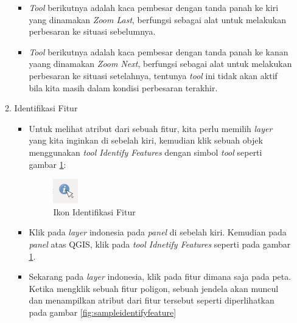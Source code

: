 \begin{enumerate}[A.]
\begin{enumerate}[1.]
\begin{itemize}
    \item \textit{Tool} berikutnya adalah kaca pembesar dengan tanda panah ke kiri yang dinamakan \textit{Zoom Last}, berfungsi sebagai alat untuk melakukan perbesaran ke situasi sebelumnya. 
    
    \item \textit{Tool} berikutnya adalah kaca pembesar dengan tanda panah ke kanan yaang dinamakan \textit{Zoom Next}, berfungsi sebagai alat untuk melakukan perbesaran ke situasi setelahnya, tentunya \textit{tool} ini tidak akan aktif bila kita masih dalam kondisi perbesaran terakhir.
 
  \end{itemize}
  
  \item Identifikasi Fitur
  
  \begin{itemize}
  
    \item Untuk melihat atribut dari sebuah fitur, kita perlu memilih \textit{layer} yang kita inginkan di sebelah kiri, kemudian klik sebuah objek menggunakan \textit{tool Identify Features} dengan simbol \textit{tool} seperti gambar \ref{fig:identifyfeaturesicon}:
    
    \begin{figure}[H]
      \centering
      \includegraphics[scale=1]{./resources/011-identify-features-icon}
      \caption{Ikon Identifikasi Fitur}
      \label{fig:identifyfeaturesicon}
    \end{figure}
    
    \item Klik pada \textit{layer} indonesia pada \textit{panel} di sebelah kiri. Kemudian pada \textit{panel} atas QGIS, klik pada \textit{tool Idnetify Features} seperti pada gambar \ref{fig:identifyfeaturesicon}.
    
    \item Sekarang pada \textit{layer} indonesia, klik pada fitur dimana saja pada peta. Ketika mengklik sebuah fitur poligon, sebuah jendela akan muncul dan menampilkan atribut dari fitur tersebut seperti diperlihatkan pada gambar \ref{fig:sampleidentifyfeature}
    

\end{itemize}
\end{enumerate}
\end{enumerate}
